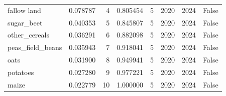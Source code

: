 \begin{tabular}{lrrrrrrr}
fallow land & 0.078787 & 4 & 0.805454 & 5 & 2020 & 2024 & False \\
sugar\_beet & 0.040353 & 5 & 0.845807 & 5 & 2020 & 2024 & False \\
other\_cereals & 0.036291 & 6 & 0.882098 & 5 & 2020 & 2024 & False \\
peas\_field\_beans & 0.035943 & 7 & 0.918041 & 5 & 2020 & 2024 & False \\
oats & 0.031900 & 8 & 0.949941 & 5 & 2020 & 2024 & False \\
potatoes & 0.027280 & 9 & 0.977221 & 5 & 2020 & 2024 & False \\
maize & 0.022779 & 10 & 1.000000 & 5 & 2020 & 2024 & False \\
\bottomrule
\end{tabular}
